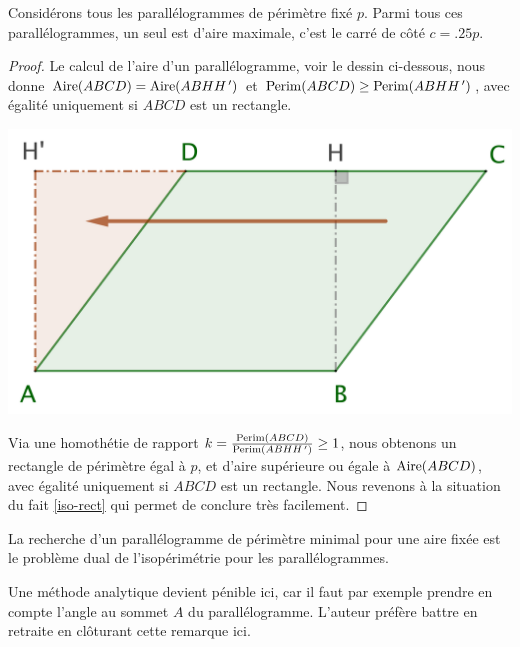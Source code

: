 \begin{fact} \label{iso-para}
	Considérons tous les parallélogrammes de périmètre fixé $p$. Parmi tous ces parallélogrammes, un seul est d'aire maximale, c'est le carré de côté $c = \num{.25} p$.
\end{fact}


\begin{proof}
	Le calcul de l'aire d'un parallélogramme, voir le dessin ci-dessous, nous donne 
	$\mathrm{Aire}(ABCD) = \mathrm{Aire}(ABHH^{\,\prime})$ et 
	$\mathrm{Perim}(ABCD) \geq \mathrm{Perim}(ABHH^{\,\prime})$, 
	avec égalité uniquement si $ABCD$ est un rectangle. 
	
	\begin{center}
		\includegraphics[scale=.4]{content/parallelogram/para-2-rect.png}
	\end{center}
	
	Via une homothétie de rapport $k = \frac{\mathrm{Perim}(ABCD)}{\mathrm{Perim}(ABHH^{\,\prime})} \geq 1$, nous obtenons un rectangle 
	de périmètre égal à $p$,
	et d'aire supérieure ou égale à $\mathrm{Aire}(ABCD)$, 
	avec égalité uniquement si $ABCD$ est un rectangle.
	Nous revenons à la situation du fait \ref{iso-rect} qui permet de conclure très facilement.
\end{proof}




\begin{remark}
	La recherche d'un parallélogramme de périmètre minimal pour une aire fixée est le problème dual de l'isopérimétrie pour les parallélogrammes.
\end{remark}




\begin{remark}
	Une méthode analytique devient pénible ici, car il faut par exemple prendre en compte l'angle au sommet $A$ du parallélogramme. L'auteur préfère battre en retraite en clôturant cette remarque ici.
\end{remark}
